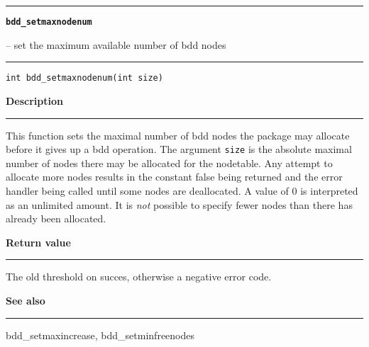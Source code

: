 \begin{minipage}{\textwidth}

\noindent\begin{minipage}{\textwidth}
\rule{\textwidth}{0.5mm}
{\tt\bf bdd\_setmaxnodenum }
\--- set the maximum available number of bdd nodes  \hspace{\fill}
\\\rule[1.5ex]{\textwidth}{0.5mm}
\end{minipage}

\noindent\begin{verbatim}
int bdd_setmaxnodenum(int size) 
\end{verbatim}

\vspace{\parsep}\noindent
{\bf Description}\\\rule[1.5ex]{\textwidth}{0.2mm}\vspace{-1.5ex}\setlength{\parindent}{1em}
This function sets the maximal number of bdd nodes the package may
         allocate before it gives up a bdd operation. The
	 argument {\tt size} is the absolute maximal number of nodes there
	 may be allocated for the nodetable. Any attempt to allocate more
	 nodes results in the constant false being returned and the error
	 handler being called until some nodes are deallocated.
	 A value of 0 is interpreted as an unlimited amount.
	 It is {\em not} possible to specify
	 fewer nodes than there has already been allocated. 

\setlength{\parindent}{0em}\vspace{\parsep}\vspace{\baselineskip}\noindent
{\bf Return value}\\\rule[1.5ex]{\textwidth}{0.2mm}\vspace{-1.5ex}
The old threshold on succes, otherwise a negative error code. 

\vspace{\parsep}\vspace{\baselineskip}\noindent
{\bf See also}\\\rule[1.5ex]{\textwidth}{0.2mm}\vspace{-1.5ex}
bdd\_setmaxincrease, bdd\_setminfreenodes 
\end{minipage}
\vspace{8ex}

